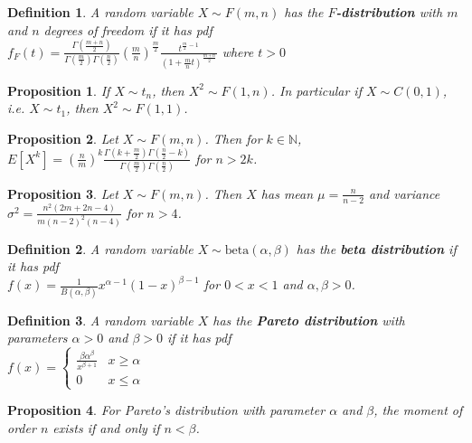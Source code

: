 \documentclass[14pt,twoside]{extreport}
\theoremstyle{dotless}
\newtheorem*{defn}{\footnotesize Definition}
\newtheorem*{prop}{\footnotesize Proposition} %
\begin{document}
\begin{defn}
    A random variable $X \sim F(m,n)$ has the \textbf{$F$-distribution} with $m$ and $n$ degrees of freedom if it has pdf \\ 
    $ f_F(t) = \displaystyle \frac{\Gamma\left(\frac{m + n}{2} \right)}{\Gamma\left(\frac{m}{2} \right) \Gamma\left(\frac{n}{2} \right)} \displaystyle \left(\frac{m}{n}\right)^{\frac{m}{2}} \frac{t^{\frac{m}{2} - 1}}{(1 + \frac{m}{n}t)^{\frac{m + n}{2}}} $ where $t > 0$
\end{defn}

\begin{prop}
    If $X \sim t_n$, then $X^2 \sim F(1,n)$. In particular if $X \sim C(0,1)$, i.e. $X \sim t_1$, then $X^2 \sim F(1,1)$.
\end{prop}

\begin{prop}
    Let $X \sim F(m,n)$. Then for $k \in \mathbb{N}$, $E[X^k] =\displaystyle \left(\frac{n}{m}\right)^k \frac{\Gamma(k + \frac{m}{2}) \Gamma(\frac{n}{2} - k)}{\Gamma(\frac{m}{2}) \Gamma(\frac{n}{2})}$ for $n > 2k$.
\end{prop}

\begin{prop}
    Let $X \sim F(m,n)$. Then $X$ has mean $\mu = \displaystyle \frac{n}{n-2}$ and variance $\sigma^2 = \displaystyle \frac{n^2 (2m + 2n - 4)}{m (n-2)^2 (n-4)}$ for $n > 4$.
\end{prop}

\begin{defn}
    A random variable $X \sim \text{beta}(\alpha, \beta)$ has the \textbf{beta distribution} if it has pdf \\
    $ f(x) = \displaystyle \frac{1}{B(\alpha, \beta)} x^{\alpha-1} (1-x)^{\beta - 1}$ for $0 < x < 1$ and $\alpha, \beta > 0$.
\end{defn}

\begin{defn}
    A random variable $X$ has the \textbf{Pareto distribution} with parameters $\alpha > 0$ and $\beta > 0$ if it has pdf \\
    $f(x) = \begin{cases} \displaystyle \frac{\beta \alpha^\beta}{x^{\beta + 1}} & x \geq \alpha \\ 0 & x \leq \alpha \end{cases}$
\end{defn}

\begin{prop}
    For Pareto's distribution with parameter $\alpha$ and $\beta$, the moment of order $n$ exists if and only if $n < \beta$. 
\end{prop}
\end{document}
